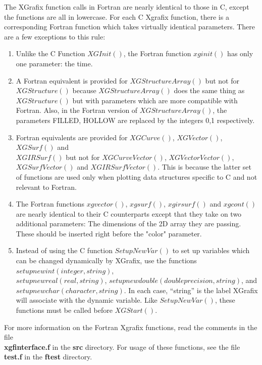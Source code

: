 The XGrafix function calls in Fortran are nearly identical to those in C, 
except the functions are all in lowercase. For each C Xgrafix function,
there is a corresponding Fortran function which takes virtually identical
parameters. There are a few exceptions to this rule:

\begin{enumerate}
\item Unlike the C Function $XGInit()$, the Fortran function $xginit()$ 
has only one parameter: the time.

\item A Fortran equivalent is provided for $XGStructureArray()$ but not for
$XGStructure()$ because $XGStructureArray()$
does the same thing as $XGStructure()$ but with parameters which
are more compatible with Fortran. Also, in the Fortran version of
$XGStructureArray()$, the  parameters FILLED, HOLLOW are replaced
by the integers 0,1 respectively.

\item Fortran equivalents are provided for $XGCurve()$, $XGVector()$, $XGSurf()$ and \\ 
$XGIRSurf()$ but not for $XGCurveVector()$, $XGVectorVector()$,
$XGSurfVector()$ and $XGIRSurfVector()$. This is because the latter set of functions 
are used only when plotting 
data structures specific to C and not relevant to Fortran.

\item The Fortran functions $xgvector()$, $xgsurf()$, $xgirsurf()$ 
and $xgcont()$ are nearly identical to their C counterparts except that they 
take on two additional parameters: The dimensions of the 2D array they are 
passing. These should be inserted right before the "color" parameter.  

\item Instead of using the C function $SetupNewVar()$ to set up variables which can be 
changed dynamically by XGrafix, use the functions $setupnewint(integer, string)$, \\
$setupnewreal(real, string)$, $setupnewdouble(double precision, string)$, and \\
$setupnewchar(character, string)$. In each case,
``string'' is the label XGrafix will associate with the dynamic variable. 
Like $SetupNewVar()$, these functions must be called before $XGStart()$.
\end{enumerate}
For more information on the Fortran Xgrafix functions, read the comments in the file \\
{\bf xgfinterface.f} in the {\bf src} directory.
For usage of these functions, see the file {\bf test.f} in the {\bf ftest} directory.

